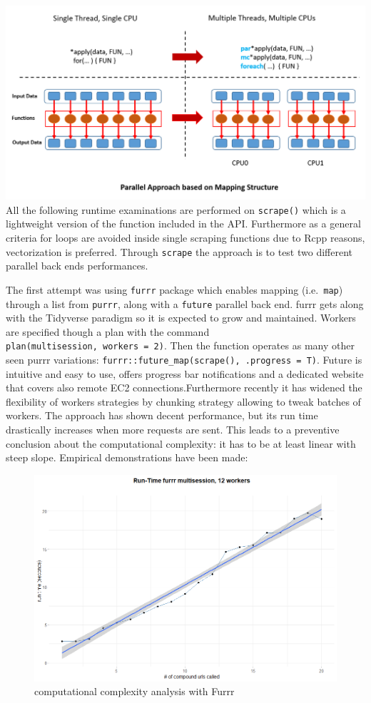 \documentclass[
  12pt,
  a4paper,
  oneside]{book}
\theoremstyle{definition}
\theoremstyle{definition}
\theoremstyle{definition}
\theoremstyle{remark}
\begin{document}
\includegraphics{images/parallel_mapping.png}
All the following runtime examinations are performed on \texttt{scrape()} which is a lightweight version of the function included in the API.
Furthermore as a general criteria for loops are avoided inside single scraping functions due to Rcpp reasons, vectorization is preferred. Through \texttt{scrape} the approach is to test two different parallel back ends performances.

The first attempt was using \texttt{furrr} package \citep{furrr} which enables mapping (i.e.~\texttt{map}) through a list from \texttt{purrr}, along with a \texttt{future} parallel back end. furrr gets along with the Tidyverse paradigm so it is expected to grow and maintained. Workers are specified though a plan with the command \texttt{plan(multisession,\ workers\ =\ 2)}. Then the function operates as many other seen purrr variations:
\texttt{furrr::future\_map(scrape(),\ .progress\ =\ T)}. Future is intuitive and easy to use, offers progress bar notifications and a dedicated website that covers also remote EC2 connections.Furthermore recently it has widened the flexibility of workers strategies by chunking strategy allowing to tweak batches of workers.
The approach has shown decent performance, but its run time drastically increases when more requests are sent. This leads to a preventive conclusion about the computational complexity: it has to be at least linear with steep slope. Empirical demonstrations have been made:

\begin{figure}
\centering
\includegraphics{images/furrr.png}
\caption{\label{fig:furrr}computational complexity analysis with Furrr}
\end{figure}
\end{document}
